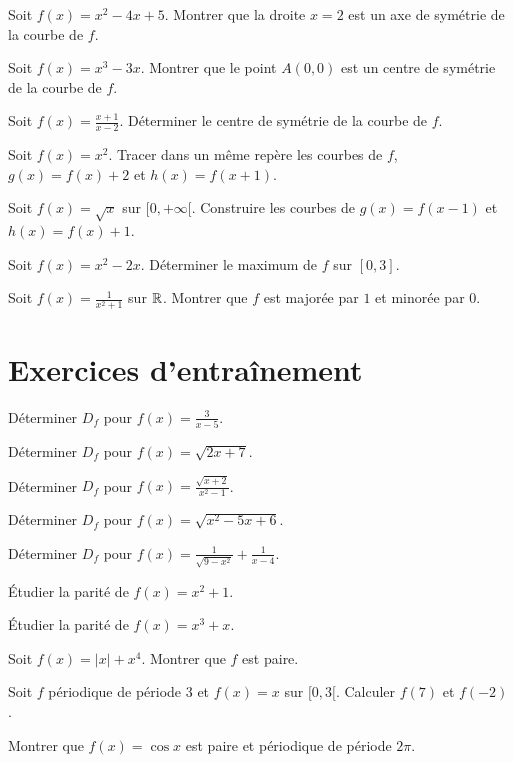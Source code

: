 
\exo{}
Soit $f(x)=x^2-4x+5$. Montrer que la droite $x=2$ est un axe de symétrie de la courbe de $f$.

\exo{}
Soit $f(x)=x^3-3x$. Montrer que le point $A(0,0)$ est un centre de symétrie de la courbe de $f$.

\exo{}
Soit $f(x)=\frac{x+1}{x-2}$. Déterminer le centre de symétrie de la courbe de $f$.


\exo{}
Soit $f(x)=x^2$. Tracer dans un même repère les courbes de $f$, $g(x)=f(x)+2$ et $h(x)=f(x+1)$.

\exo{}
Soit $f(x)=\sqrt{x}$ sur $[0,+\infty[$. Construire les courbes de $g(x)=f(x-1)$ et $h(x)=f(x)+1$.

\exo{}
Soit $f(x)=x^2-2x$. Déterminer le maximum de $f$ sur $[0,3]$.

\exo{}
Soit $f(x)=\frac{1}{x^2+1}$ sur $\mathbb{R}$. Montrer que $f$ est majorée par $1$ et minorée par $0$.

\section{Exercices d'entraînement}


\exo{} Déterminer $D_f$ pour $f(x)=\frac{3}{x-5}$.

\exo{} Déterminer $D_f$ pour $f(x)=\sqrt{2x+7}$.

\exo{} Déterminer $D_f$ pour $f(x)=\frac{\sqrt{x+2}}{x^2-1}$.

\exo{} Déterminer $D_f$ pour $f(x)=\sqrt{x^2-5x+6}$.

\exo{} Déterminer $D_f$ pour $f(x)=\frac{1}{\sqrt{9-x^2}}+\frac{1}{x-4}$.


\exo{} Étudier la parité de $f(x)=x^2+1$.

\exo{} Étudier la parité de $f(x)=x^3+x$.

\exo{} Soit $f(x)=|x|+x^4$. Montrer que $f$ est paire.

\exo{} Soit $f$ périodique de période $3$ et $f(x)=x$ sur $[0,3[$. Calculer $f(7)$ et $f(-2)$.

\exo{} Montrer que $f(x)=\cos x$ est paire et périodique de période $2\pi$.

